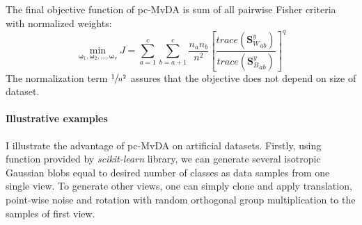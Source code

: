         The final objective function of pc-MvDA is sum of all pairwise Fisher criteria with normalized weights:
        \begin{equation}
            \operatorname*{min}_{\boldsymbol{\omega}_1, \boldsymbol{\omega}_2,..., \boldsymbol{\omega}_v}{J}=\sum_{a=1}^{c}\sum_{b=a+1}^{c}{\frac{n_an_b}{n^2}{\left[{\frac{trace\left({\boldsymbol{S}_W^y}_{ab}\right)}{trace\left({\boldsymbol{S}_B^y}_{ab}\right)}}\right]}^{q}}
            \label{eq:pc-MvDA}
        \end{equation}
        The normalization term $\sfrac{1}{n^2}$ assures that the objective does not depend on size of dataset.


    \paragraph{Illustrative examples}
        I illustrate the advantage of pc-MvDA on artificial datasets.
        Firstly, using function provided by \textit{scikit-learn} library, we can generate several isotropic Gaussian blobs equal to desired number of classes as data samples from one single view.  %
        To generate other views, one can simply clone and apply translation, point-wise noise and rotation with random orthogonal group multiplication to the samples of first view.

